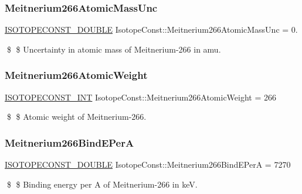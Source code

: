 \subsubsection{\texorpdfstring{Meitnerium266\+Atomic\+Mass\+Unc}{Meitnerium266AtomicMassUnc}}
{\footnotesize\ttfamily \mbox{\hyperlink{group___isotope_const-_macros_ga8f45a7272ce02c0b4c65c44636ed719a}{I\+S\+O\+T\+O\+P\+E\+C\+O\+N\+S\+T\+\_\+\+D\+O\+U\+B\+LE}} Isotope\+Const\+::\+Meitnerium266\+Atomic\+Mass\+Unc = 0.}

\$ \$ Uncertainty in atomic mass of Meitnerium-\/266 in amu. \mbox{\label{group___isotope_const-_meitnerium-_mt266_ga619b650ad149363bdaa73748e501ba0f}} 
\subsubsection{\texorpdfstring{Meitnerium266\+Atomic\+Weight}{Meitnerium266AtomicWeight}}
{\footnotesize\ttfamily \mbox{\hyperlink{group___isotope_const-_macros_ga5f18360b3e99483a35c32d789e62621c}{I\+S\+O\+T\+O\+P\+E\+C\+O\+N\+S\+T\+\_\+\+I\+NT}} Isotope\+Const\+::\+Meitnerium266\+Atomic\+Weight = 266}

\$ \$ Atomic weight of Meitnerium-\/266. \mbox{\label{group___isotope_const-_meitnerium-_mt266_ga136b7aa1f4bfb9b56ca43dd54e5da6df}} 
\subsubsection{\texorpdfstring{Meitnerium266\+Bind\+E\+PerA}{Meitnerium266BindEPerA}}
{\footnotesize\ttfamily \mbox{\hyperlink{group___isotope_const-_macros_ga8f45a7272ce02c0b4c65c44636ed719a}{I\+S\+O\+T\+O\+P\+E\+C\+O\+N\+S\+T\+\_\+\+D\+O\+U\+B\+LE}} Isotope\+Const\+::\+Meitnerium266\+Bind\+E\+PerA = 7270}

\$ \$ Binding energy per A of Meitnerium-\/266 in keV. \mbox{\label{group___isotope_const-_meitnerium-_mt266_ga1fdb513d763e17785da80fe9eb6476fb}} 
